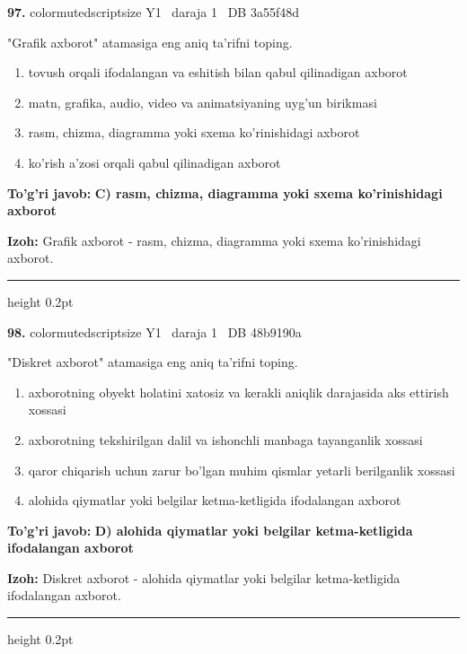 \documentclass[10pt,a4paper,oneside]{article}
\begin{document}
\noindent\textbf{\color{ink}97.}  {color{muted}scriptsize Y1 \textbullet\ daraja 1 \textbullet\ DB 3a55f48d}
\par
"Grafik axborot" atamasiga eng aniq ta'rifni toping.
\begin{enumerate}[label=\Alph*),leftmargin=9mm]
\item tovush orqali ifodalangan va eshitish bilan qabul qilinadigan axborot
\item matn, grafika, audio, video va animatsiyaning uyg'un birikmasi
\item rasm, chizma, diagramma yoki sxema ko'rinishidagi axborot
\item ko'rish a'zosi orqali qabul qilinadigan axborot
\end{enumerate}
\begin{tcolorbox}[enhanced,breakable,colback=teal!4,colframe=teal!50!black,boxrule=0.5pt,arc=1.1mm,left=3mm,right=3mm,top=1.7mm,bottom=1.7mm,before skip=2mm,after skip=2mm]
\textbf{\color{teal}To'g'ri javob:} \textbf{C) rasm, chizma, diagramma yoki sxema ko'rinishidagi axborot}
\par\smallskip
\textbf{Izoh:} Grafik axborot - rasm, chizma, diagramma yoki sxema ko'rinishidagi axborot.
\end{tcolorbox}
\vspace{2mm}\hrule height 0.2pt \vspace{3mm}

\noindent\textbf{\color{ink}98.}  {color{muted}scriptsize Y1 \textbullet\ daraja 1 \textbullet\ DB 48b9190a}
\par
"Diskret axborot" atamasiga eng aniq ta'rifni toping.
\begin{enumerate}[label=\Alph*),leftmargin=9mm]
\item axborotning obyekt holatini xatosiz va kerakli aniqlik darajasida aks ettirish xossasi
\item axborotning tekshirilgan dalil va ishonchli manbaga tayanganlik xossasi
\item qaror chiqarish uchun zarur bo'lgan muhim qismlar yetarli berilganlik xossasi
\item alohida qiymatlar yoki belgilar ketma-ketligida ifodalangan axborot
\end{enumerate}
\begin{tcolorbox}[enhanced,breakable,colback=teal!4,colframe=teal!50!black,boxrule=0.5pt,arc=1.1mm,left=3mm,right=3mm,top=1.7mm,bottom=1.7mm,before skip=2mm,after skip=2mm]
\textbf{\color{teal}To'g'ri javob:} \textbf{D) alohida qiymatlar yoki belgilar ketma-ketligida ifodalangan axborot}
\par\smallskip
\textbf{Izoh:} Diskret axborot - alohida qiymatlar yoki belgilar ketma-ketligida ifodalangan axborot.
\end{tcolorbox}
\vspace{2mm}\hrule height 0.2pt \vspace{3mm}
\end{document}
